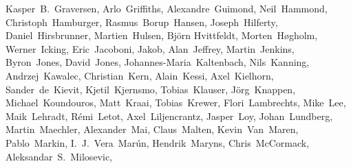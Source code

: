 \begin{flushleft}
  Kasper~B.~Graversen,    %
  Arlo~Griffiths,         %
  Alexandre~Guimond,      %
  Neil~Hammond,           %
  Christoph~Hamburger,    %
  Rasmus~Borup~Hansen,    %
  Joseph~Hilferty,        %
  Daniel~Hirsbrunner,     %
  Martien~Hulsen,         %
  Bj\"orn Hvittfeldt,     %
  Morten~H\o gholm,       %
  Werner~Icking,          %
  Eric~Jacoboni,          %
  Jakob,                  %
  Alan~Jeffrey,           %
  Martin~Jenkins,         %
  Byron~Jones,            %
  David~Jones,            %
  Johannes-Maria~Kaltenbach, %
  Nils~Kanning,           %
  Andrzej~Kawalec,        %
  Christian~Kern,         %
  Alain~Kessi,            %
  Axel~Kielhorn,          %
  Sander~de~Kievit,       %
  Kjetil~Kjernsmo,        %
  Tobias~Klauser,		%
  J\"org~Knappen,         %
  Michael~Koundouros,     %
  Matt~Kraai,             %
  Tobias~Krewer,          %
  Flori~Lambrechts,       %
  Mike~Lee,               %
  Maik~Lehradt,           %
  R\'emi~Letot,           %
  Axel~Liljencrantz,	%
  Jasper~Loy,             %
  Johan~Lundberg,         %
  Martin~Maechler,        %
  Alexander~Mai,          %
  Claus~Malten,           %
  Kevin~Van~Maren,        %
  Pablo~Markin,
  I.~J.~Vera~Mar\'un,     %
  Hendrik~Maryns,         %
  Chris~McCormack,        %
  Aleksandar~S.~Milosevic, %

\end{flushleft}
